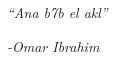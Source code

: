 \clearpage
{}

\begin{center}
\vspace*{11cm}
\textit{``Ana b7b el akl''}
\end{center}
\par
\hspace*{7cm}
\textit{-Omar Ibrahim}
